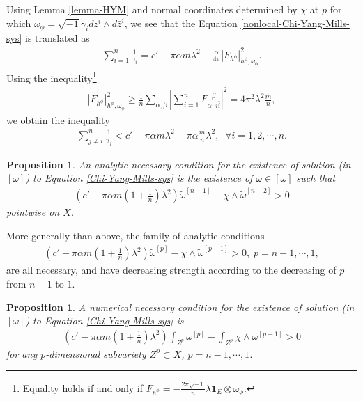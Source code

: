 \documentclass[10pt, letterpaper]{amsart}
\theoremstyle{plain}
\newtheorem{prop}[theorem]{Proposition}
\theoremstyle{definition}
\numberwithin{equation}{section}
\begin{document}
Using  Lemma \ref{lemma-HYM} and normal coordinates determined by $\chi$ at $p$ for which $\omega_\phi = \sqrt{-1}\gamma_i dz^i\wedge d\bar z^i$, we see that the Equation \eqref{nonlocal-Chi-Yang-Mills-sys} is translated as 
\begin{align*}
    \sum_{i=1}^n \frac{1}{\gamma_i}
    = c' -\pi \alpha m\lambda^2 - \frac{\alpha}{4\pi}\left|F_{h^\phi}\right|_{h^\phi, \omega_\phi}^2.
\end{align*}
Using the inequality\footnote{Equality holds if and only if $F_{h^\phi}= -\frac{2\pi\sqrt{-1}}{n}\lambda \mathbf{1}_E\otimes \omega_\phi$. } 
\begin{align*}
    \left|F_{h^\phi}\right|_{h^\phi, \omega_\phi}^2 
    \geq 
    \frac{1}{n}\sum_{\alpha,\beta}\left|\sum_{i=1}^n F_{\alpha\phantom{\beta}i\bar i}^{\phantom{\alpha}\beta}\right|^2
    = 
    4\pi^2\lambda^2\frac{m}{n},
\end{align*}
we obtain the inequality 
\begin{align*}
    \sum_{j\neq i}^n \frac{1}{\gamma_j}
    < 
    c'-\pi\alpha m\lambda^2 -\pi\alpha\frac{m}{n}\lambda^2, \;\; \forall i=1,2,\cdots, n.
\end{align*}
\begin{prop}
An analytic necessary condition for the existence of solution (in $[\omega]$) to Equation \eqref{Chi-Yang-Mills-sys} is the existence of $\widetilde\omega\in [\omega]$ such that 
\begin{align*}
    \left(c'-\pi\alpha m\left(1+\frac{1}{n}\right)\lambda^2\right)\widetilde{\omega}^{[n-1]}- \chi \wedge \widetilde{\omega}^{[n-2]}>0
\end{align*}
pointwise on $X$.
\end{prop}

More generally than above, the family of analytic conditions
\begin{align}
    \left(c'-\pi\alpha m\left(1+\frac{1}{n}\right)\lambda^2\right)\widetilde{\omega}^{[p]}- \chi \wedge \widetilde{\omega}^{[p-1]}>0, \; p=n-1, \cdots, 1, 
    \end{align}
    are all necessary, and have decreasing strength according to the decreasing of $p$ from $n-1$ to $1$.

\begin{prop}
    A numerical necessary condition for the existence of solution (in $[\omega]$) to Equation \eqref{Chi-Yang-Mills-sys} is 
    \begin{align*}
        \left(c'-\pi\alpha m\left(1+\frac{1}{n}\right)\lambda^2\right)
        \int_{Z^p} \omega^{[p]}
        - 
        \int_{Z^p}\chi \wedge \omega^{[p-1]}>0
    \end{align*}
    for any $p$-dimensional subvariety $Z^p\subset X$, $p=n-1,\cdots, 1$.
\end{prop}
\end{document}
